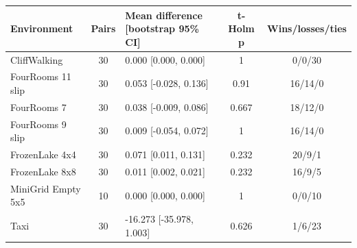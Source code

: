 \begin{tabular}{lclcc}
\toprule
Environment & Pairs & Mean difference [bootstrap 95\% CI] & t-Holm p & Wins/losses/ties \\
\midrule
CliffWalking & 30 & 0.000 [0.000, 0.000] & 1 & 0/0/30 \\
FourRooms 11 slip & 30 & 0.053 [-0.028, 0.136] & 0.91 & 16/14/0 \\
FourRooms 7 & 30 & 0.038 [-0.009, 0.086] & 0.667 & 18/12/0 \\
FourRooms 9 slip & 30 & 0.009 [-0.054, 0.072] & 1 & 16/14/0 \\
FrozenLake 4x4 & 30 & 0.071 [0.011, 0.131] & 0.232 & 20/9/1 \\
FrozenLake 8x8 & 30 & 0.011 [0.002, 0.021] & 0.232 & 16/9/5 \\
MiniGrid Empty 5x5 & 10 & 0.000 [0.000, 0.000] & 1 & 0/0/10 \\
Taxi & 30 & -16.273 [-35.978, 1.003] & 0.626 & 1/6/23 \\
\bottomrule
\end{tabular}
